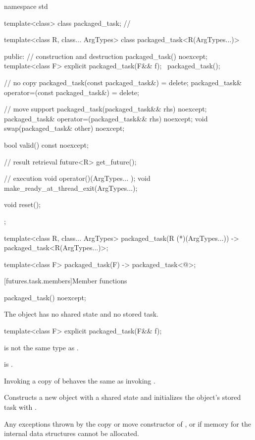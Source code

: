 %
\begin{codeblock}
namespace std {
  template<class> class packaged_task;  // \notdef

  template<class R, class... ArgTypes>
  class packaged_task<R(ArgTypes...)> {
  public:
    // construction and destruction
    packaged_task() noexcept;
    template<class F>
      explicit packaged_task(F&& f);
    ~packaged_task();

    // no copy
    packaged_task(const packaged_task&) = delete;
    packaged_task& operator=(const packaged_task&) = delete;

    // move support
    packaged_task(packaged_task&& rhs) noexcept;
    packaged_task& operator=(packaged_task&& rhs) noexcept;
    void swap(packaged_task& other) noexcept;

    bool valid() const noexcept;

    // result retrieval
    future<R> get_future();

    // execution
    void operator()(ArgTypes... );
    void make_ready_at_thread_exit(ArgTypes...);

    void reset();
  };

  template<class R, class... ArgTypes>
    packaged_task(R (*)(ArgTypes...)) -> packaged_task<R(ArgTypes...)>;

  template<class F> packaged_task(F) -> packaged_task<@\seebelow@>;
}
\end{codeblock}

[futures.task.members]{Member functions}

%
\begin{itemdecl}
packaged_task() noexcept;
\end{itemdecl}

\begin{itemdescr}
\pnum
\effects
The object has no shared state and no stored task.
\end{itemdescr}

%
\begin{itemdecl}
template<class F>
  explicit packaged_task(F&& f);
\end{itemdecl}

\begin{itemdescr}
\pnum
\constraints
{}
is not the same type as .

\pnum
\mandates
{} is .

\pnum
\expects
Invoking a copy of  behaves the same as invoking .

\pnum
\effects
Constructs a new  object with a shared state and
initializes the object's stored task with .

\pnum
\throws
Any exceptions thrown by the copy or move constructor of , or
 if memory for the internal data structures
cannot be allocated.
\end{itemdescr}

